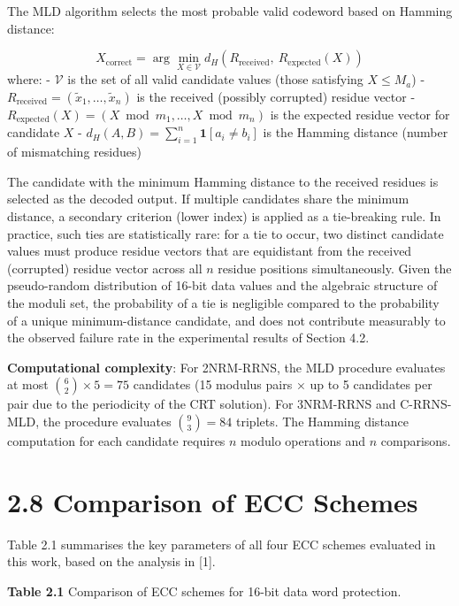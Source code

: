 \documentclass[
  12pt,
  a4paper]{report}
\begin{document}
The MLD algorithm selects the most probable valid codeword based on
Hamming distance:

\[X_{\text{correct}} = \arg\min_{X \in \mathcal{V}} d_H\!\left(R_{\text{received}},\ R_{\text{expected}}(X)\right)\]
where: - \(\mathcal{V}\) is the set of all valid candidate values (those
satisfying \(X \leq M_a\)) -
\(R_{\text{received}} = (\tilde{x}_1, \ldots, \tilde{x}_n)\) is the
received (possibly corrupted) residue vector -
\(R_{\text{expected}}(X) = (X \bmod m_1, \ldots, X \bmod m_n)\) is the
expected residue vector for candidate \(X\) -
\(d_H(A, B) = \sum_{i=1}^{n} \mathbf{1}[a_i \neq b_i]\) is the Hamming
distance (number of mismatching residues)

The candidate with the minimum Hamming distance to the received residues
is selected as the decoded output. If multiple candidates share the
minimum distance, a secondary criterion (lower index) is applied as a
tie-breaking rule. In practice, such ties are statistically rare: for a
tie to occur, two distinct candidate values must produce residue vectors
that are equidistant from the received (corrupted) residue vector across
all \(n\) residue positions simultaneously. Given the pseudo-random
distribution of 16-bit data values and the algebraic structure of the
moduli set, the probability of a tie is negligible compared to the
probability of a unique minimum-distance candidate, and does not
contribute measurably to the observed failure rate in the experimental
results of Section 4.2.

\textbf{Computational complexity}: For 2NRM-RRNS, the MLD procedure
evaluates at most \(\binom{6}{2} \times 5 = 75\) candidates (15 modulus
pairs × up to 5 candidates per pair due to the periodicity of the CRT
solution). For 3NRM-RRNS and C-RRNS-MLD, the procedure evaluates
\(\binom{9}{3} = 84\) triplets. The Hamming distance computation for
each candidate requires \(n\) modulo operations and \(n\) comparisons.

\section{2.8 Comparison of ECC Schemes}\label{comparison-of-ecc-schemes}

Table 2.1 summarises the key parameters of all four ECC schemes
evaluated in this work, based on the analysis in {[}1{]}.

\textbf{Table 2.1} Comparison of ECC schemes for 16-bit data word
protection.
\end{document}
